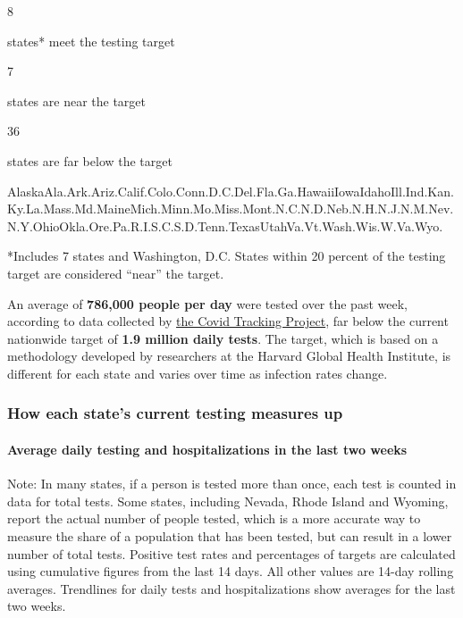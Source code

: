 8

states* meet the testing target

7

states are near the target

36

states are far below the target

AlaskaAla.Ark.Ariz.Calif.Colo.Conn.D.C.Del.Fla.Ga.HawaiiIowaIdahoIll.Ind.Kan.Ky.La.Mass.Md.MaineMich.Minn.Mo.Miss.Mont.N.C.N.D.Neb.N.H.N.J.N.M.Nev.N.Y.OhioOkla.Ore.Pa.R.I.S.C.S.D.Tenn.TexasUtahVa.Vt.Wash.Wis.W.Va.Wyo.

*Includes 7 states and Washington, D.C. States within 20 percent of the
testing target are considered ``near'' the target.

An average of \textbf{786,000 people per day} were tested over the past
week, according to data collected by
\href{https://covidtracking.com/}{the Covid Tracking Project}, far below
the current nationwide target of \textbf{1.9 million daily tests}. The
target, which is based on a methodology developed by researchers at the
Harvard Global Health Institute, is different for each state and varies
over time as infection rates change.

\hypertarget{how-each-states-current-testing-measures-up}{%
\subsubsection{How each state's current testing measures
up}\label{how-each-states-current-testing-measures-up}}

\hypertarget{average-daily-testing-and-hospitalizations-in-the-last-two-weeks}{%
\paragraph{Average daily testing and hospitalizations in the last two
weeks}\label{average-daily-testing-and-hospitalizations-in-the-last-two-weeks}}

Note: In many states, if a person is tested more than once, each test is
counted in data for total tests. Some states, including Nevada, Rhode
Island and Wyoming, report the actual number of people tested, which is
a more accurate way to measure the share of a population that has been
tested, but can result in a lower number of total tests. Positive test
rates and percentages of targets are calculated using cumulative figures
from the last 14 days. All other values are 14-day rolling averages.
Trendlines for daily tests and hospitalizations show averages for the
last two weeks.


